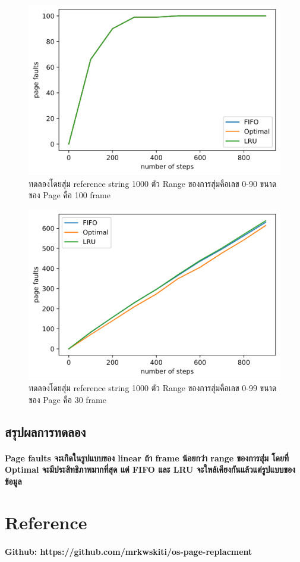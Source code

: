 \documentclass[12pt]{article}
\begin{document}
\begin{figure}[H]
\includegraphics[width=\textwidth]{3.png}
ทดลองโดยสุ่ม reference string 1000 ตัว Range ของการสุ่มคือเลข 0-90 ขนาดของ Page คือ 100 frame
\end{figure}

\begin{figure}[H]
\includegraphics[width=\textwidth]{4.png}
ทดลองโดยสุ่ม reference string 1000 ตัว Range ของการสุ่มคือเลข 0-99 ขนาดของ Page คือ 30 frame
\end{figure}

\subsection{สรุปผลการทดลอง}
\paragraph{Page faults จะเกิดในรูปแบบของ linear ถ้า frame น้อยกว่า range ของการสุ่ม โดยที่ Optimal จะมีประสิทธิภาพมากที่สุด แต่ FIFO และ LRU จะใหล้เคียงกันแล้วแต่รูปแบบของข้อมูล}

\section{Reference}
\paragraph{Github: https://github.com/mrkwskiti/os-page-replacment}
\end{document}
